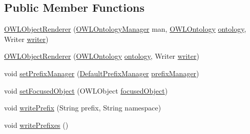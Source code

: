 \subsection*{Public Member Functions}
\begin{DoxyCompactItemize}
\item 
\hyperlink{classorg_1_1coode_1_1owlapi_1_1functionalrenderer_1_1_o_w_l_object_renderer_aa66b090e86cbea1deb22b041fc0f61c4}{O\-W\-L\-Object\-Renderer} (\hyperlink{interfaceorg_1_1semanticweb_1_1owlapi_1_1model_1_1_o_w_l_ontology_manager}{O\-W\-L\-Ontology\-Manager} man, \hyperlink{interfaceorg_1_1semanticweb_1_1owlapi_1_1model_1_1_o_w_l_ontology}{O\-W\-L\-Ontology} \hyperlink{classorg_1_1coode_1_1owlapi_1_1functionalrenderer_1_1_o_w_l_object_renderer_a3f48ba1c8438ae6385bf0964ac3fcb12}{ontology}, Writer \hyperlink{classorg_1_1coode_1_1owlapi_1_1functionalrenderer_1_1_o_w_l_object_renderer_a495157ee4d33edb42fa323358d8fcceb}{writer})
\item 
\hyperlink{classorg_1_1coode_1_1owlapi_1_1functionalrenderer_1_1_o_w_l_object_renderer_ae49b81ad45c0e100b359930c08537d47}{O\-W\-L\-Object\-Renderer} (\hyperlink{interfaceorg_1_1semanticweb_1_1owlapi_1_1model_1_1_o_w_l_ontology}{O\-W\-L\-Ontology} \hyperlink{classorg_1_1coode_1_1owlapi_1_1functionalrenderer_1_1_o_w_l_object_renderer_a3f48ba1c8438ae6385bf0964ac3fcb12}{ontology}, Writer \hyperlink{classorg_1_1coode_1_1owlapi_1_1functionalrenderer_1_1_o_w_l_object_renderer_a495157ee4d33edb42fa323358d8fcceb}{writer})
\item 
void \hyperlink{classorg_1_1coode_1_1owlapi_1_1functionalrenderer_1_1_o_w_l_object_renderer_a10b09da466cbba259df74b4a864b1693}{set\-Prefix\-Manager} (\hyperlink{classorg_1_1semanticweb_1_1owlapi_1_1util_1_1_default_prefix_manager}{Default\-Prefix\-Manager} \hyperlink{classorg_1_1coode_1_1owlapi_1_1functionalrenderer_1_1_o_w_l_object_renderer_aa04acf8b7465c15340e459e871cfef6d}{prefix\-Manager})
\item 
void \hyperlink{classorg_1_1coode_1_1owlapi_1_1functionalrenderer_1_1_o_w_l_object_renderer_a88f423e4ba8dcc10476622526b3fd140}{set\-Focused\-Object} (O\-W\-L\-Object \hyperlink{classorg_1_1coode_1_1owlapi_1_1functionalrenderer_1_1_o_w_l_object_renderer_aab7d3d8914e344953df950891a85df5a}{focused\-Object})
\item 
void \hyperlink{classorg_1_1coode_1_1owlapi_1_1functionalrenderer_1_1_o_w_l_object_renderer_a371b859a9b8eeae893bf0e328c04e627}{write\-Prefix} (String prefix, String namespace)
\item 
void \hyperlink{classorg_1_1coode_1_1owlapi_1_1functionalrenderer_1_1_o_w_l_object_renderer_ae3af6d48d46fabc77fb54a935eb86d47}{write\-Prefixes} ()

\end{DoxyCompactItemize}
